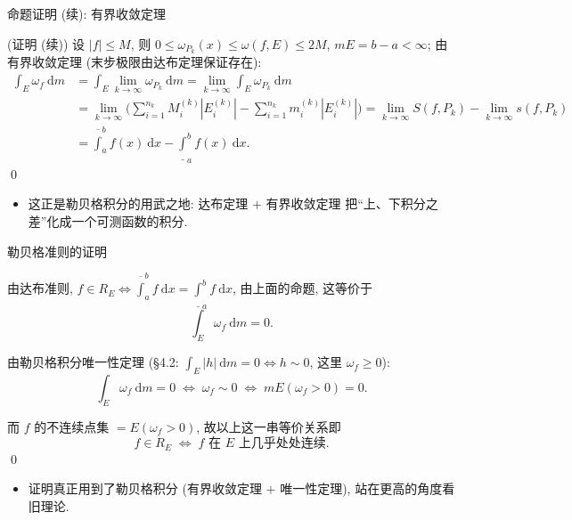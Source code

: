 
\begin{frame}{命题证明 (续): 有界收敛定理}

\startproof[bg=yellow, fg=red](证明 (续))
设 $|f| \leqslant M$, 则 $0 \leqslant \omega_{P_k}(x) \leqslant \omega(f, E) \leqslant 2M$,
$mE = b - a < \infty$; 由\alert{有界收敛定理} (末步极限由达布定理保证存在):
\[
\begin{aligned}
\int_E \omega_f ~ \mathrm{d} m
&= \int_E \lim_{k \to \infty} \omega_{P_k} ~ \mathrm{d} m
= \lim_{k \to \infty} \int_E \omega_{P_k} ~ \mathrm{d} m \\
&= \lim_{k \to \infty} \Big( \sum_{i=1}^{n_k} M_i^{(k)} |E_i^{(k)}| - \sum_{i=1}^{n_k} m_i^{(k)} |E_i^{(k)}| \Big)
= \lim_{k \to \infty} S(f, P_k) - \lim_{k \to \infty} s(f, P_k) \\
&= \overline{\int}_a^b f(x) ~ \mathrm{d} x - \underline{\int}_a^b f(x) ~ \mathrm{d} x .
\end{aligned}
\]
\qed

\pause

\begin{itemize}
\item 这正是勒贝格积分的用武之地: 达布定理 $+$ 有界收敛定理
  把``上、下积分之差''化成一个\alert{可测函数的积分}.
\end{itemize}

\end{frame}


\begin{frame}{勒贝格准则的证明}

由达布准则, $f \in R_E \Longleftrightarrow \overline{\int}_a^b f ~ \mathrm{d} x = \underline{\int}_a^b f ~ \mathrm{d} x$,
由上面的命题, 这等价于
\[
\int_E \omega_f ~ \mathrm{d} m = 0 .
\]

\pause

由勒贝格积分\alert{唯一性定理} (\S 4.2: $\int_E |h| ~ \mathrm{d} m = 0 \Longleftrightarrow h \sim 0$,
这里 $\omega_f \geqslant 0$):
\[
\int_E \omega_f ~ \mathrm{d} m = 0
\;\Longleftrightarrow\;
\omega_f \sim 0
\;\Longleftrightarrow\;
mE(\omega_f > 0) = 0 .
\]

\pause

而 $f$ 的不连续点集 $= E(\omega_f > 0)$, 故以上这一串等价关系即
\[
f \in R_E
\;\Longleftrightarrow\;
f \text{ 在 } E \text{ 上几乎处处连续} .
\]
\qed

\pause

\begin{itemize}
\item 证明真正用到了勒贝格积分 (有界收敛定理 $+$ 唯一性定理),
  站在更高的角度看旧理论.
\end{itemize}

\end{frame}

